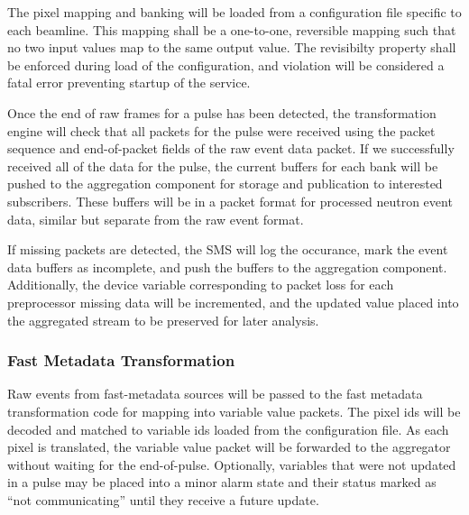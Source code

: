 The pixel mapping and banking will be loaded from a configuration file specific
to each beamline. This mapping shall be a one-to-one, reversible mapping such
that no two input values map to the same output value. The revisibilty property
shall be enforced during load of the configuration, and violation will be
considered a fatal error preventing startup of the service.

Once the end of raw frames for a pulse has been detected, the transformation
engine will check that all packets for the pulse were received using the
packet sequence and end-of-packet fields of the raw event data packet. If
we successfully received all of the data for the pulse, the current buffers
for each bank will be pushed to the aggregation component for storage and
publication to interested subscribers. These buffers will be in a packet format
for processed neutron event data, similar but separate from the raw event
format.

If missing packets are detected, the SMS will log the occurance, mark the
event data buffers as incomplete, and push the buffers to the aggregation
component. Additionally, the device variable corresponding to packet loss
for each preprocessor missing data will be incremented, and the updated
value placed into the aggregated stream to be preserved for later analysis.


\subsubsection{Fast Metadata Transformation}

Raw events from fast-metadata sources will be passed to the fast metadata
transformation code for mapping into variable value packets. The pixel ids will
be decoded and matched to variable ids loaded from the configuration file. As
each pixel is translated, the variable value packet will be forwarded to the
aggregator without waiting for the end-of-pulse. Optionally, variables that
were not updated in a pulse may be placed into a minor alarm state and their
status marked as ``not communicating'' until they receive a future update.

